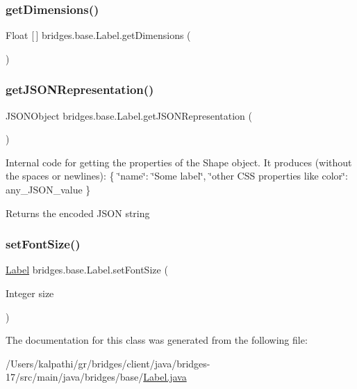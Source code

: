 \subsubsection{\texorpdfstring{get\+Dimensions()}{getDimensions()}}
{\footnotesize\ttfamily Float \mbox{[}$\,$\mbox{]} bridges.\+base.\+Label.\+get\+Dimensions (\begin{DoxyParamCaption}{ }\end{DoxyParamCaption})}

\mbox{\label{classbridges_1_1base_1_1_label_a6befc6655ce36868213be289571c6315}} 
\subsubsection{\texorpdfstring{get\+J\+S\+O\+N\+Representation()}{getJSONRepresentation()}}
{\footnotesize\ttfamily J\+S\+O\+N\+Object bridges.\+base.\+Label.\+get\+J\+S\+O\+N\+Representation (\begin{DoxyParamCaption}{ }\end{DoxyParamCaption})}

Internal code for getting the properties of the Shape object. It produces (without the spaces or newlines)\+: \{ \char`\"{}name\char`\"{}\+: \char`\"{}\+Some label\char`\"{}, \char`\"{}other C\+S\+S properties like color\char`\"{}\+: any\+\_\+\+J\+S\+O\+N\+\_\+value \} \begin{DoxyReturn}{Returns}
the encoded J\+S\+ON string 
\end{DoxyReturn}
\mbox{\label{classbridges_1_1base_1_1_label_ab5f2d60e519db2499f326c4ccb967b25}} 
\subsubsection{\texorpdfstring{set\+Font\+Size()}{setFontSize()}}
{\footnotesize\ttfamily \mbox{\hyperlink{classbridges_1_1base_1_1_label}{Label}} bridges.\+base.\+Label.\+set\+Font\+Size (\begin{DoxyParamCaption}\item[{Integer}]{size }\end{DoxyParamCaption})}



The documentation for this class was generated from the following file\+:\begin{DoxyCompactItemize}
\item 
/\+Users/kalpathi/gr/bridges/client/java/bridges-\/17/src/main/java/bridges/base/\mbox{\hyperlink{_label_8java}{Label.\+java}}\end{DoxyCompactItemize}
